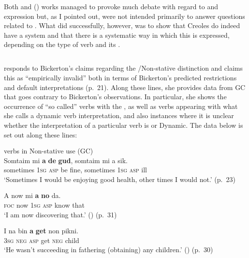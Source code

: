 Both  and (\citeyear{Bickerton1981}) works managed to provoke much
debate with regard to  and  expression but, as I pointed
out, were not intended primarily to answer questions related to
.  What \citet{Bickerton1975} did successfully, however, was to
show that Creoles do indeed have a  system and that there is a
systematic way in which this is expressed, depending on the type of
verb and its .

\subsection{\citet{Jaganauth1987}}\label{sec:jaganauth}\label{sec:Jaganauth}

\citet{Jaganauth1987} responds to Bickerton’s claims regarding the
\slash Non-sta\-tive distinction and claims this as ``empirically
invalid” both in terms of Bickerton’s predicted restrictions and
default interpretations (p.~21). Along these lines, she provides data
from GC that goes contrary to Bickerton’s observations.  In
particular, she shows the occurrence of ``so called”  verbs with
the  , as well as  verbs appearing
with what she calls a dynamic verb interpretation, and also instances
where it is unclear whether the interpretation of a particular verb is
 or Dynamic.  The data below is set out along these lines:

\ea%
\label{ex:2:10}
 verbs in Non-stative use (GC)\\

\ea
\gll Somtaim           mi  \textbf{a} \textbf{de} \textbf{gud},  somtaim          mi           a       sik.\\      
  sometimes  \textsc{1sg}  \textsc{asp}       be          fine, sometimes   \textsc{1sg}  \textsc{asp}     ill\\ 

\glt `Sometimes I would be enjoying good health, other times I would not.' (p.~23)

\ex
\gll     A   now        mi \textbf{a}      \textbf{no} da.\\
\textsc{foc} now    \textsc{1sg}   \textsc{asp} know    that\\
\glt `I am now discovering that.' (\DYNAMIC) (p.~31)

\ex
\gll     I           na     bin   \textbf{a} \textbf{get}        non    pikni.\\
\textsc{3sg} \textsc{neg} {\TNS} \textsc{asp}        get \textsc{neg}   child\\
\glt `He wasn’t succeeding in fathering (obtaining) any children.'
(\DYNAMIC) (p.~30)

